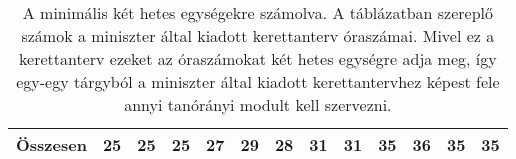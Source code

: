 \begin{landscape}
\begin{table}[]
\begin{tabular}{l|l|l|l|l|l|l|l|l|l|l|l|l}
    \textbf{Összesen}                                   & \textbf{25}                           & \textbf{25} & \textbf{25} & \textbf{27} & \textbf{29} & \textbf{28} & \textbf{31} & \textbf{31} & \textbf{35} & \textbf{36} & \textbf{35} & \textbf{35} \\ \hline
  \end{tabular}
  \caption{A minimális két hetes egységekre számolva. A táblázatban szereplő számok a miniszter által kiadott kerettanterv óraszámai. Mivel ez a kerettanterv ezeket az óraszámokat két hetes egységre adja meg, így egy-egy tárgyból a miniszter által kiadott kerettantervhez képest fele annyi tanórányi modult kell szervezni.}  
\end{table}

\end{landscape}